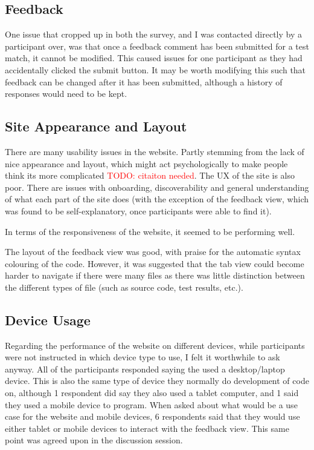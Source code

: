 \documentclass[a4paper,11pt]{report}
\newcommand{\todo}[1]{\textcolor{red}{TODO: #1}}
\begin{document}
\subsection{Feedback}
One issue that cropped up in both the survey, and I was contacted directly by a participant over, was that once a feedback comment has been submitted for a test match, it cannot be modified. This caused issues for one participant as they had accidentally clicked the submit button. It may be worth modifying this such that feedback can be changed after it has been submitted, although a history of responses would need to be kept.\par
\subsection{Site Appearance and Layout}
There are many usability issues in the website. Partly stemming from the lack of nice appearance and layout, which might act psychologically to make people think its more complicated \todo{citaiton needed}. The UX of the site is also poor. There are issues with onboarding, discoverability and general understanding of what each part of the site does (with the exception of the feedback view, which was found to be self-explanatory, once participants were able to find it).\par
In terms of the responsiveness of the website, it seemed to be performing well.\par
The layout of the feedback view was good, with praise for the automatic syntax colouring of the code. However, it was suggested that the tab view could become harder to navigate if there were many files as there was little distinction between the different types of file (such as source code, test results, etc.).\par
\subsection{Device Usage}
Regarding the performance of the website on different devices, while participants were not instructed in which device type to use, I felt it worthwhile to ask anyway. All of the participants responded saying the used a desktop/laptop device. This is also the same type of device they normally do development of code on, although 1 respondent did say they also used a tablet computer, and 1 said they used a mobile device to program. When asked about what would be a use case for the website and mobile devices, 6 respondents said that they would use either tablet or mobile devices to interact with the feedback view. This same point was agreed upon in the discussion session.\par
\end{document}

